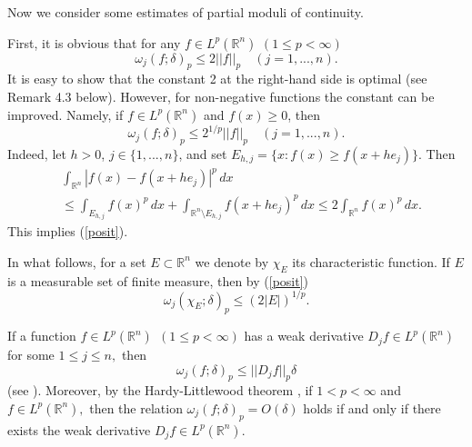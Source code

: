 \documentclass[12pt,twoside,reqno]{amsart}
\numberwithin{equation}{section}
\theoremstyle{definition}
\numberwithin{equation}{section}
\begin{document}
Now we consider some estimates of partial moduli of continuity.

First, it is obvious that for any $f\in L^p({\mathbb{R}}^n)$
$(1\le p<\infty)$
\begin{equation}\label{First}
{\omega}_j(f;{\delta})_p\le 2||f||_p \quad (j=1,...,n).
\end{equation}
It is easy to show that the constant 2 at the right-hand side is optimal (see Remark 4.3 below). However,
for non-negative functions the constant can be improved. Namely, if $f\in L^p({\mathbb{R}}^n)$ and $f(x)\ge 0$, then
\begin{equation}\label{posit}
{\omega}_j(f;{\delta})_p\le 2^{1/p}||f||_p \quad (j=1,...,n).
\end{equation}
Indeed, let  $h>0$, $j\in\{1,...,n\}$,  and set $E_{h,j}=\{x:
f(x)\ge f(x+he_j)\}$. Then
$$
\begin{aligned}
&\int_{{\mathbb{R}}^n}|f(x)-f(x+he_j)|^p\,dx\\
&\le \int_{E_{h,j}}f(x)^p\,dx+\int_{{\mathbb{R}}^n\setminus E_{h,j}}f(x+he_j)^p\,dx\le 2\int_{{\mathbb{R}}^n}f(x)^p\,dx.
\end{aligned}
$$
This implies (\ref{posit}).

In what follows, for a  set $E\subset {\mathbb{R}}^n$ we denote by $\chi_E$
its characteristic function. If $E$ is a measurable set of finite
measure, then by (\ref{posit})
\begin{equation}\label{charact}
{\omega}_j(\chi_E;{\delta})_p\le (2|E|)^{1/p}.
\end{equation}

If a function  $f\in L^p({\mathbb{R}}^n)~~(1\le p<\infty)$ has a weak
derivative $D_j f\in L^p({\mathbb{R}}^n)$ for some $1\le j\le n,$ then
\begin{equation}\label{ocenka}
{\omega}_j(f;{\delta})_p\le ||D_j f||_p{\delta}
\end{equation}
(see \cite[\S\, 16]{BIN}). Moreover, by the Hardy-Littlewood theorem
\cite[\S \,4.8]{Nik}, if  $1<p<\infty$ and $f\in L^p({\mathbb{R}}^n),$ then
the relation ${\omega}_j(f;{\delta})_p=O({\delta})$ holds if and only if there exists
the weak derivative $D_jf\in L^p({\mathbb{R}}^n).$
\end{document}
